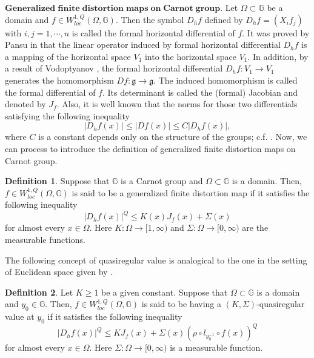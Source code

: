\documentclass[11pt,twoside]{article}
\theoremstyle{definition}
\newtheorem{defn}{Definition}[section]
\theoremstyle{remark}
\begin{document}
$\mathbf{Generalized\;finite\;distortion\;maps\;on\;Carnot\;group}.$  
Let $\Omega\subset\mathbb{G}$ be a domain and $f\in W_{loc}^{1,Q}(\Omega,\mathbb{G}).$ Then the symbol $D_{h}f$  defined by $D_{h}f=(X_{i}f_{j})$ with $i,j=1,\cdots,n$  is called the formal horizontal differential of $f.$ It was proved by Pansu in \cite[Proposition 4.1]{Pan89} that the linear operator induced
by  formal horizontal differential $D_{h}f$ is a mapping of the horizontal space $V_{1}$ into the horizontal space $V_{1}.$ In addition, by a result of 
Vodoptyanov \cite{Vod96}, the formal horizontal differential $D_{h}f:V_{1}\rightarrow V_{1}$ generates the homomorphism $Df:\mathfrak{g}\rightarrow \mathfrak{g}.$ The induced homomorphism is called the formal differential of $f.$ Its determinant is called the (formal) Jacobian and denoted by $J_{f}.$ Also, it is well known that the norms for those two differentials satisfying the following inequality
$$\vert D_{h}f(x)\vert\leq\vert Df(x)\vert\leq C\vert D_{h}f(x)\vert,$$
 where $C$ is a constant depends only on the structure of the groups; c.f. \cite{BV23}. Now, we can process to introduce the definition of generalized finite distortion maps on Carnot group.
\begin{defn}\label{df1}
Suppose that $\mathbb{G}$ is a Carnot group and $ \Omega\subset\mathbb{G}$ is a domain.  Then, $f\in W^{1,Q}_{loc}(\Omega,\mathbb{G})$
is said to be a generalized finite distortion map if it satisfies the following inequality
\begin{equation}
\vert D_{h}f(x)\vert^{Q}\leq K(x)J_{f}(x)+\Sigma(x)
\end{equation}
for almost every $x\in\Omega.$ Here $K:\Omega\rightarrow[1,\infty)$ and $\Sigma:\Omega\rightarrow[0,\infty)$ are the measurable functions.
\end{defn}

 The following concept of quasiregular value is analogical to the one in the setting of Euclidean space given  by \cite[Definition 1.1]{KO222}.
\begin{defn}\label{df2}
Let  $K\geq1$ be a given constant. Suppose that $ \Omega\subset\mathbb{G}$ is a domain and $y_{0}\in\mathbb{G}.$  Then, $f\in W^{1,Q}_{loc}(\Omega,\mathbb{G})$
is said to be having a $(K, \Sigma)$-quasiregular value at $y_{0}$ if it satisfies the following inequality
\begin{equation}\label{df2111111}
\vert D_{h}f(x)\vert^{Q}\leq KJ_{f}(x)+\Sigma(x)(\rho\circ l_{y_{0}^{-1}}\circ f(x))^{Q}
\end{equation}
for almost every $x\in\Omega.$ Here $\Sigma:\Omega\rightarrow[0,\infty)$ is a measurable function.
\end{defn}
\end{document}
